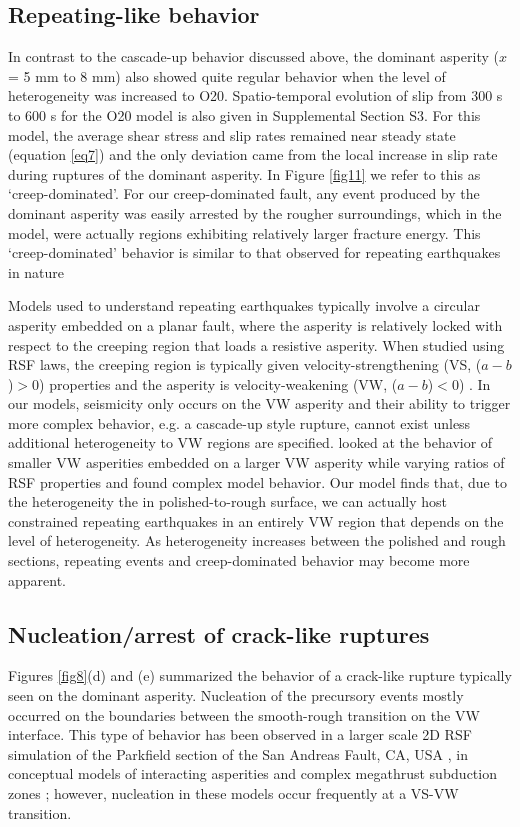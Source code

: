 \documentclass[preprint,1p, 10pt,authoryear]{elsarticle}
\begin{document}
\subsection{Repeating-like behavior}
In contrast to the cascade-up behavior discussed above, the dominant asperity ($x$ = 5 mm to 8 mm) also showed quite regular behavior when the level of heterogeneity was increased to O20.  Spatio-temporal evolution of slip from 300 s to 600 s for the O20 model is also given in Supplemental Section S3. For this model, the average shear stress and slip rates remained near steady state (equation \eqref{eq7}) and the only deviation came from the local increase in slip rate during ruptures of the dominant asperity.  In Figure \ref{fig11} we refer to this as `creep-dominated'. For our creep-dominated fault, any event produced by the dominant asperity was easily arrested by the rougher surroundings, which in the model, were actually regions exhibiting relatively larger fracture energy.  This `creep-dominated' behavior is similar to that observed for repeating earthquakes in nature \citep[e.g., ][]{Beeler2001,Uchida2019}

Models used to understand repeating earthquakes typically involve a circular asperity embedded on a planar fault, where the asperity is relatively locked with respect to the creeping region that loads a resistive asperity. When studied using RSF laws, the creeping region is typically given velocity-strengthening (VS, ($a-b$)$>$0) properties and the asperity is velocity-weakening  (VW, ($a-b$)$<$0) \citep{Kato2003,Chen2009}. In our models, seismicity only occurs on the VW asperity and their ability to trigger more complex behavior, e.g. a cascade-up style rupture, cannot exist unless additional heterogeneity to VW regions are specified. \citet{Noda2013} looked at the behavior of smaller VW asperities embedded on a larger VW asperity while varying ratios of RSF properties and found complex model behavior. Our model finds that, due to the heterogeneity the in polished-to-rough surface, we can actually host constrained repeating earthquakes in an entirely VW region that depends on the level of heterogeneity.  As heterogeneity increases between the polished and rough sections, repeating events and creep-dominated behavior may become more apparent.

\subsection{Nucleation/arrest of crack-like ruptures}
Figures \ref{fig8}(d) and  (e) summarized the behavior of a crack-like rupture typically seen on the dominant asperity. Nucleation of the precursory events mostly occurred on the boundaries between the smooth-rough transition on the VW interface. This type of behavior has been observed in a larger scale 2D RSF simulation of the Parkfield section of the San Andreas Fault, CA, USA \citep{Barbot2012}, in conceptual models of interacting asperities \citep{Kato2003} and complex megathrust subduction zones \citep{Kaneko2010}; however, nucleation in these models occur frequently at a VS-VW transition.  
\end{document}
